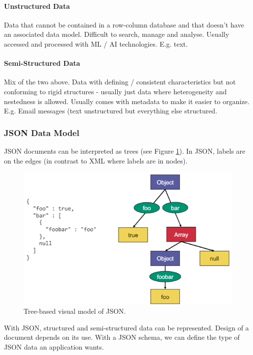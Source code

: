 \paragraph{Unstructured Data}
Data that cannot be contained in a row-column database and that doesn't have an associated data model. Difficult to search, manage and analyse. Usually accessed and processed with ML / AI technologies. E.g. text.

\paragraph{Semi-Structured Data}
Mix of the two above. Data with defining / consistent characteristics but not conforming to rigid structures - usually just data where heterogeneity and nestedness is allowed. Usually comes with metadata to make it easier to organize. E.g. Email messages (text unstructured but everything else structured.


\subsubsection{JSON Data Model}

JSON documents can be interpreted as trees (see Figure \ref{fig:jsontree}). In JSON, labels are on the edges (in contrast to XML where labels are in nodes).

\begin{figure}[h]
	\centering
	\includegraphics[scale=0.7]{images/3-jsontree.PNG}
	\caption{Tree-based visual model of JSON.}
	\label{fig:jsontree}
\end{figure}

With JSON, structured and semi-structured data can be represented. Design of a document depends on its use. With a JSON schema, we can define the type of JSON data an application wants.

